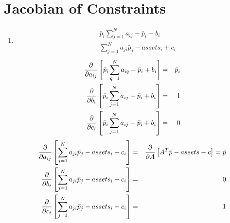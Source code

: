 \documentclass{article}
\begin{document}
\section{Jacobian of Constraints}

\begin{enumerate}
\item 
\begin{eqnarray*}
&&\bar{p}_{i}\sum_{j=1}^{N}a_{ij}-\bar{p}_{i}+b_{i} \\
&&\sum_{j=1}^{N}a_{ji}\bar{p}_{j}-assets_{i}+c_{i}
\end{eqnarray*}%
\begin{eqnarray*}
\frac{\partial }{\partial a_{ij}}\left[ \bar{p}_{i}\sum_{q=1}^{N}a_{iq}-\bar{%
p}_{i}+b_{i}\right] &=&\bar{p}_{i} \\
\frac{\partial }{\partial b_{i}}\left[ \bar{p}_{i}\sum_{j=1}^{N}a_{ij}-\bar{p%
}_{i}+b_{i}\right] &=&1 \\
\frac{\partial }{\partial c_{i}}\left[ \bar{p}_{i}\sum_{j=1}^{N}a_{ij}-\bar{p%
}_{i}+b_{i}\right] &=&0
\end{eqnarray*}%
\begin{eqnarray*}
\frac{\partial }{\partial a_{ij}}\left[ \sum_{j=1}^{N}a_{ji}\bar{p}%
_{j}-assets_{i}+c_{i}\right] &=&\frac{\partial }{\partial A}\left[ A^{T}\bar{%
p}-assets-c\right] =\bar{p} \\
\frac{\partial }{\partial b_{i}}\left[ \sum_{j=1}^{N}a_{ji}\bar{p}%
_{j}-assets_{i}+c_{i}\right] &=&0 \\
\frac{\partial }{\partial c_{i}}\left[ \sum_{j=1}^{N}a_{ji}\bar{p}%
_{j}-assets_{i}+c_{i}\right] &=&1
\end{eqnarray*}


\end{enumerate}
\end{document}

